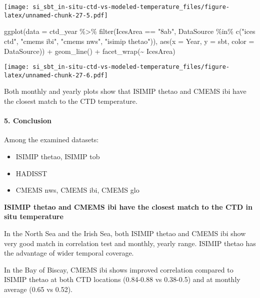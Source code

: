 \documentclass[
]{article}
\newenvironment{Shaded}{\begin{snugshade}}{\end{snugshade}}
\newcommand{\AttributeTok}[1]{\textcolor[rgb]{0.77,0.63,0.00}{#1}}
\newcommand{\FunctionTok}[1]{\textcolor[rgb]{0.00,0.00,0.00}{#1}}
\newcommand{\NormalTok}[1]{#1}
\newcommand{\SpecialCharTok}[1]{\textcolor[rgb]{0.00,0.00,0.00}{#1}}
\newcommand{\StringTok}[1]{\textcolor[rgb]{0.31,0.60,0.02}{#1}}
\begin{document}
\texttt{[image: si\_sbt\_in-situ-ctd-vs-modeled-temperature\_files/figure-latex/unnamed-chunk-27-5.pdf]}

\begin{Shaded}
\begin{Highlighting}[]
\FunctionTok{ggplot}\NormalTok{(}\AttributeTok{data =}\NormalTok{ ctd\_year }\SpecialCharTok{\%\textgreater{}\%} \FunctionTok{filter}\NormalTok{(IcesArea }\SpecialCharTok{==} \StringTok{"8ab"}\NormalTok{, DataSource }\SpecialCharTok{\%in\%} \FunctionTok{c}\NormalTok{(}\StringTok{"ices ctd"}\NormalTok{, }\StringTok{"cmems ibi"}\NormalTok{, }\StringTok{"cmems nws"}\NormalTok{, }\StringTok{"isimip thetao"}\NormalTok{)), }\FunctionTok{aes}\NormalTok{(}\AttributeTok{x =}\NormalTok{ Year, }\AttributeTok{y =}\NormalTok{ sbt, }\AttributeTok{color =}\NormalTok{ DataSource)) }\SpecialCharTok{+} \FunctionTok{geom\_line}\NormalTok{() }\SpecialCharTok{+} \FunctionTok{facet\_wrap}\NormalTok{(}\SpecialCharTok{\textasciitilde{}}\NormalTok{ IcesArea) }
\end{Highlighting}
\end{Shaded}

\texttt{[image: si\_sbt\_in-situ-ctd-vs-modeled-temperature\_files/figure-latex/unnamed-chunk-27-6.pdf]}

Both monthly and yearly plots show that ISIMIP thetao and CMEMS ibi have
the closest match to the CTD temperature.

\hypertarget{conclusion}{%
\paragraph{5. Conclusion}\label{conclusion}}

Among the examined datasets:

\begin{itemize}
\item
  ISIMIP thetao, ISIMIP tob
\item
  HADISST
\item
  CMEMS nws, CMEMS ibi, CMEMS glo
\end{itemize}

\textbf{ISIMIP thetao and CMEMS ibi have the closest match to the CTD in
situ temperature}

In the North Sea and the Irish Sea, both ISIMIP thetao and CMEMS ibi
show very good match in correlation test and monthly, yearly range.
ISIMIP thetao has the advantage of wider temporal coverage.

In the Bay of Biscay, CMEMS ibi shows improved correlation compared to
ISIMIP thetao at both CTD locations (0.84-0.88 vs 0.38-0.5) and at
monthly average (0.65 vs 0.52).
\end{document}
